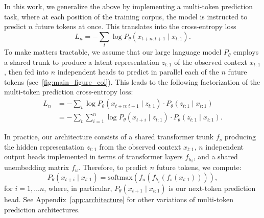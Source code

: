 \documentclass{article}
\theoremstyle{plain}
\theoremstyle{definition}
\theoremstyle{remark}
\begin{document}
In this work, we generalize the above by implementing a multi-token prediction task, where at each position of the training corpus, the model is instructed to predict $n$ future tokens at once.
This translates into the cross-entropy loss
\begin{equation}
    L_n = - \sum_t \log P_\theta(x_{t+n:t+1} \mid x_{t:1}).
\end{equation}
To make matters tractable, we assume that our large language model $P_\theta$ employs a shared trunk to produce a latent representation $z_{t:1}$ of the observed context $x_{t:1}$, then fed into $n$ independent heads to predict in parallel each of the $n$ future tokens (see~\cref{fig:main_figure_col}).
This leads to the following factorization of the multi-token prediction cross-entropy loss:
\begin{align*} \label{eq:loss-n}
    L_n
    &= - \sum_t \log P_\theta(x_{t+n:t+1} \mid z_{t:1}) \cdot P_\theta(z_{t:1} \mid x_{t:1}) \\
    &= - \sum_t \sum_{i=1}^{n} \log P_\theta(x_{t+i} \mid z_{t:1}) \cdot P_\theta(z_{t:1} \mid x_{t:1}).
\end{align*}

In practice, our architecture consists of a shared transformer trunk $f_s$ producing the hidden representation $z_{t:1}$ from the observed context $x_{t:1}$, $n$ independent output heads implemented in terms of transformer layers $f_{h_i}$, and a shared unembedding matrix $f_u$.
Therefore, to predict $n$ future tokens, we compute:
$$P_\theta(x_{t+i} \mid x_{t:1}) = \text{softmax}(f_u(f_{h_i}(f_s(x_{t:1})))),$$
for $i=1,\ldots n$, where, in particular, $P_\theta(x_{t+1} \mid x_{t:1})$ is our next-token prediction head.
See Appendix~\ref{app:architecture} for other variations of multi-token prediction architectures.
\end{document}
